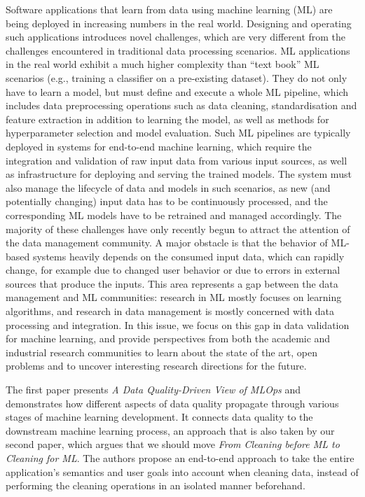 \documentclass[11pt]{article}
\begin{document}
Software applications that learn from data using machine learning (ML) are being deployed in increasing numbers in the real world. Designing and operating such applications introduces novel challenges, which are very different from the challenges encountered in traditional data processing scenarios. ML applications in the real world exhibit a much higher complexity than ``text book'' ML scenarios (e.g., training a classifier on a pre-existing dataset). They do not only have to learn a model, but must define and execute a whole ML pipeline, which includes data preprocessing operations such as data cleaning, standardisation and feature extraction in addition to learning the model, as well as methods for hyperparameter selection and model evaluation. Such ML pipelines are typically deployed in systems for end-to-end machine learning, which require the integration and validation of raw input data from various input sources, as well as infrastructure for deploying and serving the trained models. The system must also manage the lifecycle of data and models in such scenarios, as new (and potentially changing) input data has to be continuously processed, and the corresponding ML models have to be retrained and managed accordingly. The majority of these challenges have only recently begun to attract the attention of the data management community. 
%
A major obstacle is that the behavior of ML-based systems heavily depends on the consumed input data, which can rapidly change, for example due to changed user behavior or due to errors in external sources that produce the inputs. This area represents a gap between the data management and ML communities: research in ML mostly focuses on learning algorithms, and research in data management is mostly concerned with data processing and integration. In this issue, we focus on this gap in data validation for machine learning, and provide perspectives from both the academic and industrial research communities to learn about the state of the art, open problems and to uncover interesting research directions for the future.

The first paper presents \textit{A Data Quality-Driven View of MLOps} and demonstrates how different aspects of data quality propagate through various stages of machine learning development. It connects data quality to the downstream machine learning process, an approach that is also taken by our second paper, which argues that we should move \textit{From Cleaning before ML to Cleaning for ML}. The authors propose an end-to-end approach to take the entire application's semantics and user goals into account when cleaning data, instead of performing the cleaning operations in an isolated manner beforehand.
\end{document}
